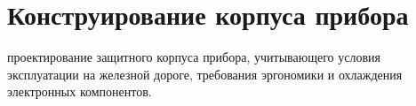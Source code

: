 \section{Конструирование корпуса прибора}
\label{sec:enclosure}

проектирование защитного корпуса прибора, учитывающего условия эксплуатации на железной дороге, требования эргономики и охлаждения электронных компонентов.